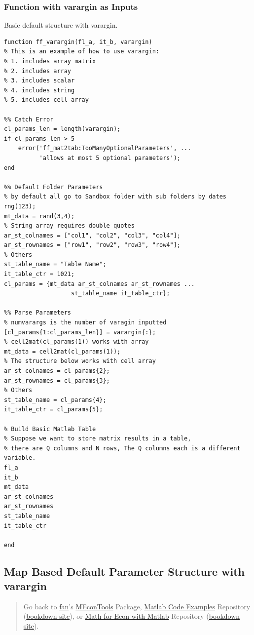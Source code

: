 \documentclass[
]{book}
\begin{document}
\hypertarget{function-with-varargin-as-inputs}{%
\subsubsection{Function with varargin as Inputs}\label{function-with-varargin-as-inputs}}

Basic default structure with varargin.

\begin{verbatim}
function ff_varargin(fl_a, it_b, varargin)
% This is an example of how to use varargin:
% 1. includes array matrix
% 2. includes array
% 3. includes scalar
% 4. includes string
% 5. includes cell array

%% Catch Error
cl_params_len = length(varargin);
if cl_params_len > 5
    error('ff_mat2tab:TooManyOptionalParameters', ...
          'allows at most 5 optional parameters');
end

%% Default Folder Parameters
% by default all go to Sandbox folder with sub folders by dates
rng(123);
mt_data = rand(3,4);
% String array requires double quotes
ar_st_colnames = ["col1", "col2", "col3", "col4"];
ar_st_rownames = ["row1", "row2", "row3", "row4"];
% Others
st_table_name = "Table Name";
it_table_ctr = 1021;
cl_params = {mt_data ar_st_colnames ar_st_rownames ...
                   st_table_name it_table_ctr};

%% Parse Parameters
% numvarargs is the number of varagin inputted
[cl_params{1:cl_params_len}] = varargin{:};
% cell2mat(cl_params(1)) works with array
mt_data = cell2mat(cl_params(1));
% The structure below works with cell array
ar_st_colnames = cl_params{2};
ar_st_rownames = cl_params{3};
% Others
st_table_name = cl_params{4};
it_table_ctr = cl_params{5};

% Build Basic Matlab Table
% Suppose we want to store matrix results in a table,
% there are Q columns and N rows, The Q columns each is a different variable.
fl_a
it_b
mt_data
ar_st_colnames
ar_st_rownames
st_table_name
it_table_ctr

end
\end{verbatim}

\hypertarget{map-based-default-parameter-structure-with-varargin}{%
\subsection{Map Based Default Parameter Structure with varargin}\label{map-based-default-parameter-structure-with-varargin}}

\begin{quote}
Go back to \href{http://fanwangecon.github.io/}{fan}'s \href{https://fanwangecon.github.io/MEconTools/}{MEconTools} Package, \href{https://fanwangecon.github.io/M4Econ/}{Matlab Code Examples} Repository (\href{https://fanwangecon.github.io/M4Econ/bookdown}{bookdown site}), or \href{https://fanwangecon.github.io/Math4Econ/}{Math for Econ with Matlab} Repository (\href{https://fanwangecon.github.io/Math4Econ/bookdown}{bookdown site}).
\end{quote}
\end{document}
